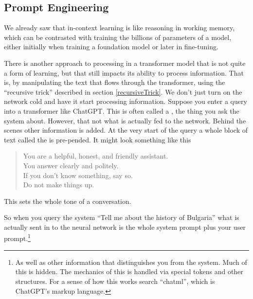 \subsection{Prompt Engineering} 

We already saw that in-context learning is like reasoning in working memory, which can be contrasted with training the billions of parameters of a model, either initially when training a foundation model or later in fine-tuning.

There is another approach to processing in a transformer model that is not quite a form of learning, but that still impacts its ability to process information.  That is, by manipulating the text that flows through the transformer, using the ``recursive trick'' described in section \ref{recursiveTrick}.  We don't just turn on the network cold and have it start processing information.  Suppose you enter a  query into a transformer like ChatGPT. This is  often called a , the thing you ask the system about. However, that  not what is actually fed to the network. Behind the scenes other information is added.  At the very start of the query a whole block of text called the  is pre-pended. It might look something like this

\begin{quote}
You are a helpful, honest, and friendly assistant.\\
You answer clearly and politely.\\
If you don’t know something, say so.\\
Do not make things up.
\end{quote}

This sets the whole tone of a conversation. 

So when you query the system ``Tell me about the history of Bulgaria'' what is actually sent in to the neural network is the whole system prompt plus your user prompt.\footnote{As well as other information that distinguishes you from the system. Much of this is hidden. The mechanics of this is handled via special tokens and other structures. For a sense of how this works search ``chatml'', which is ChatGPT's markup language.}

